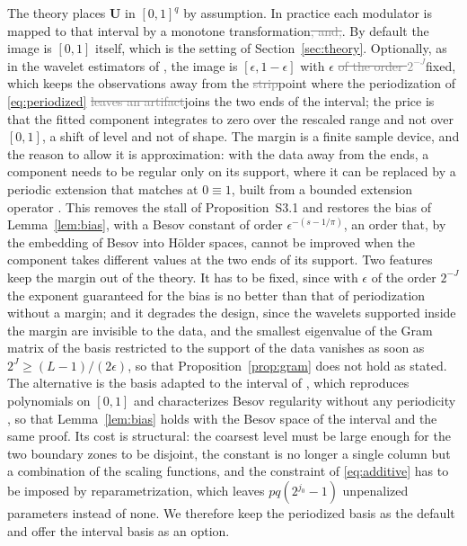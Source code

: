 \documentclass[12pt]{article} %
\theoremstyle{definition}
\theoremstyle{plain}
\newcommand{\jzero}{j_{0}}
\newcommand{\bU}{\mathbf{U}}
\begin{document}
The theory places $\bU$ in $[0,1]^q$ by assumption. In practice each modulator
is mapped to that interval by a monotone transformation\textcolor{gray}{\sout{, and,}}\textcolor{colR1}{.
By default the image is $[0,1]$ itself, which is the setting of
Section~\ref{sec:theory}. Optionally,} as in the
wavelet estimators of \citet*{Montoril-Chang-Vidakovic-2019}, the image is
$[\epsilon, 1-\epsilon]$ with $\epsilon$ \textcolor{gray}{\sout{of the order $2^{-J}$}}\textcolor{colR1}{fixed}, which keeps the
observations away from the \textcolor{gray}{\sout{strip}}\textcolor{colR1}{point} where the periodization of
\eqref{eq:periodized} \textcolor{gray}{\sout{leaves an artifact}}\textcolor{colR1}{joins the two ends of the interval}; the price is that the fitted
component integrates to zero over the rescaled range and not over $[0,1]$, a
shift of level and not of shape. \textcolor{colR1}{The margin is a finite sample
device, and the reason to allow it is approximation: with the data away from
the ends, a component needs to be regular only on its support, where it can be
replaced by a periodic extension that matches at $0 \equiv 1$, built from a
bounded extension operator \citep[Chapter~3]{Triebel-1983}. This removes the
stall of Proposition~S3.1 and restores the bias of Lemma~\ref{lem:bias}, with
a Besov constant of order $\epsilon^{-(s-1/\pi)}$, an order that, by the
embedding of Besov into H\"older spaces, cannot be improved when the component
takes different values at the two ends of its support. Two features keep the
margin out of the theory. It has to be fixed, since with $\epsilon$ of the
order $2^{-J}$ the exponent guaranteed for the bias is no better than that of
periodization without a margin; and it degrades the design, since the
wavelets supported inside the margin are invisible to the data, and the
smallest eigenvalue of the Gram matrix of the basis restricted to the support
of the data vanishes as soon as $2^{J} \ge (L-1)/(2\epsilon)$, so that
Proposition~\ref{prop:gram} does not hold as stated.} The alternative is the basis adapted to the
interval of \citet*{cohen1993wavelets}, which reproduces polynomials on $[0,1]$
and characterizes Besov regularity without any periodicity
\citep[Section 3.9]{Cohen-2003}, so that Lemma~\ref{lem:bias} holds with the
Besov space of the interval and the same proof. Its cost is structural: the
coarsest level must be large enough for the two boundary zones to be disjoint,
the constant is no longer a single column but a combination of the scaling
functions, and the constraint of \eqref{eq:additive} has to be imposed by
reparametrization, which leaves $pq(2^{\jzero}-1)$ unpenalized parameters
instead of none. We therefore keep the periodized basis as the default and
offer the interval basis as an option.
\end{document}
